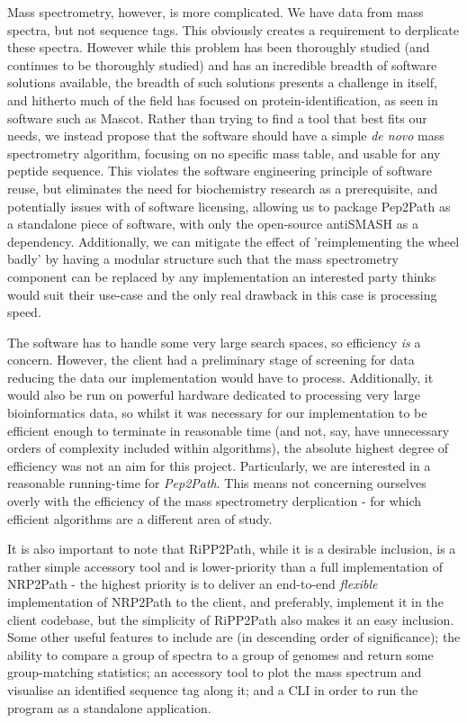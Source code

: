 \documentclass{l4proj}
\newcommand{\cit}[1]{\citep{#1}}
\begin{document}
Mass spectrometry, however, is more complicated. We have data from mass spectra, but not sequence tags. This obviously creates a requirement to derplicate these spectra. However while this problem has been thoroughly studied (and continues to be thoroughly studied) and has an incredible breadth of software solutions available, the breadth of such solutions presents a challenge in itself, and hitherto much of the field has focused on protein-identification, \cit{msomics} as seen in software such as Mascot. \cit{mascot} Rather than trying to find a tool that best fits our needs, we instead propose that the software should have a simple \textit{de novo} mass spectrometry algorithm, focusing on no specific mass table, and usable for any peptide sequence. This violates the software engineering principle of software reuse, but eliminates the need for biochemistry research as a prerequisite, and potentially issues with of software licensing, allowing us to package Pep2Path as a standalone piece of software, with only the open-source antiSMASH as a dependency. Additionally, we can mitigate the effect of 'reimplementing the wheel badly' by having a modular structure such that the mass spectrometry component can be replaced by any implementation an interested party thinks would suit their use-case and the only real drawback in this case is processing speed.

The software has to handle some very large search spaces, so efficiency \textit{is} a concern. However, the client had a preliminary stage of screening for data reducing the data our implementation would have to process. Additionally, it would also be run on powerful hardware dedicated to processing very large bioinformatics data, so whilst it was necessary for our implementation to be efficient enough to terminate in reasonable time (and not, say, have unnecessary orders of complexity included within algorithms), the absolute highest degree of efficiency was not an aim for this project. Particularly, we are interested in a reasonable running-time for \textit{Pep2Path}. This means not concerning ourselves overly with the efficiency of the mass spectrometry derplication - for which efficient algorithms are a different area of study.

It is also important to note that RiPP2Path, while it is a desirable inclusion, is a rather simple accessory tool and is lower-priority than a full implementation of NRP2Path - the highest priority is to deliver an end-to-end \textit{flexible} implementation of NRP2Path to the client, and preferably, implement it in the client codebase, but the simplicity of RiPP2Path also makes it an easy inclusion. Some other useful features to include are (in descending order of significance); the ability to compare a group of spectra to a group of genomes and return some group-matching statistics; an accessory tool to plot the mass spectrum and visualise an identified sequence tag along it; and a CLI in order to run the program as a standalone application.
\end{document}
